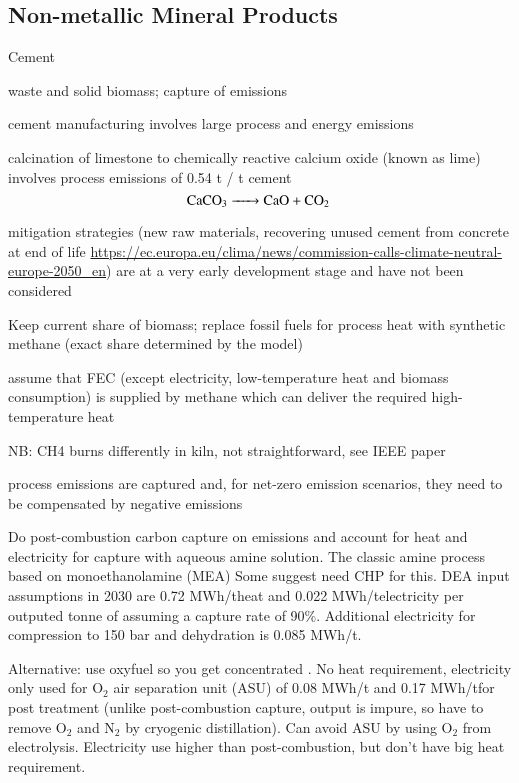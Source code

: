\subsection{Non-metallic Mineral Products}

Cement


waste and solid biomass; capture of \co emissions

cement manufacturing involves large process and energy emissions

calcination of limestone to chemically reactive calcium oxide (known as lime)
involves process emissions of 0.54 t \ce{\co} / t cement
\begin{equation}
    \ce{CaCO3 -> CaO + \co}
\end{equation}

mitigation strategies (new raw materials, recovering unused cement from concrete at end of life \url{https://ec.europa.eu/clima/news/commission-calls-climate-neutral-europe-2050_en})
are at a very early development stage and have not been considered

Keep current share of biomass; replace fossil fuels for process heat with
synthetic methane (exact share determined by the model)

assume that FEC (except electricity, low-temperature heat and biomass consumption)
is supplied by methane which can deliver the required high-temperature heat

NB: CH4 burns differently in kiln, not straightforward, see IEEE paper

process emissions are captured and, for net-zero emission scenarios,
they need to be compensated by negative emissions

Do post-combustion carbon capture on emissions and account for heat and
electricity for capture with aqueous amine solution. The classic amine process
based on monoethanolamine (MEA) Some suggest need CHP for this. DEA input
assumptions in 2030 are 0.72 MWh/t\co heat and 0.022 MWh/t\co electricity
per outputed tonne of \co assuming a capture rate of 90\%. Additional
electricity for \co compression to 150 bar and dehydration is 0.085
MWh/t\co.

Alternative: use oxyfuel so you get concentrated \co. No heat requirement,
electricity only used for O$_2$ air separation unit (ASU) of 0.08 MWh/t\co
and 0.17 MWh/t\co for post treatment (unlike post-combustion capture, output
is impure, so have to remove O$_2$ and N$_2$ by cryogenic distillation). Can
avoid ASU by using O$_2$ from electrolysis. Electricity use higher than
post-combustion, but don't have big heat requirement.

